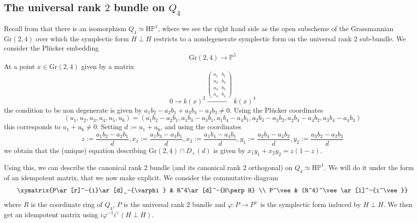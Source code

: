 \documentclass[11pt,leqno]{article}
\newcommand{\Proj}{{\mathbb P}}
\renewcommand{\1}{{\rm 1\hspace*{-0.4ex}%
\rule{0.1ex}{1.52ex}\hspace*{0.2ex}}}
\newcommand{\<}[1]{{\langle}#1 {\rangle}}
\theoremstyle{plain}
\theoremstyle{definition}
\theoremstyle{remark}
\numberwithin{equation}{section}
\begin{document}
\subsection{The universal rank $2$ bundle on $Q_4$}\label{sec:universal2bundle}

Recall from \cite{Panin21} that there is an isomorphism $Q_4\simeq \mathrm{H}\Proj^1$, where we see the right hand side as the open subscheme of the Grassmannian $\mathrm{Gr}(2,4)$ over which the symplectic form $H\perp H$ restricts to a nondegenerate symplectic form on the universal rank $2$ sub-bundle. We consider the Plücker embedding 
\[
\mathrm{Gr}(2,4)\to \mathbb{P}^5
\]
At a point $x\in  \mathrm{Gr}(2,4)$ given by a matrix
\[
0\to k(x)^2\xrightarrow{\begin{pmatrix} a_1 & b_1 \\ a_2 & b_2 \\ a_3 & b_3 \\ a_4 & b_4\end{pmatrix}} k(x)^4
\]
the condition to be non degenerate is given by $a_1b_2-a_2b_1+a_3b_4-a_4b_3\neq 0$. Using the Plücker coordinates 
\[
(u_1,u_2,u_3,u_4,u_5,u_6)=(a_1b_2-a_2b_1,a_1b_3-a_3b_1,a_1b_4-a_4b_1,a_2b_3-a_3b_2,a_2b_4-a_4b_2,a_3b_4-a_4b_3)
\]
this corresponds to $u_1+u_6\neq 0$. Setting $d:=u_1+u_6$, and using the coordinates 
\[
z:=\frac {a_1b_2-a_2b_1}d,x_1:=\frac {a_1b_3-a_3b_1}d, x_2:=\frac {a_1b_4-a_4b_1}d, y_1:=\frac {a_2b_4-a_4b_2}d, y_2:=\frac {a_3b_2-a_2b_3}d
\]
we obtain that the (unique) equation describing $\mathrm{Gr}(2,4)\cap D_+(d)$ is given by $x_1y_1+x_2y_2=z(1-z)$. 

Using this, we can describe the canonical rank $2$ bundle (and its canonical rank $2$ orthogonal) on $Q_4\simeq \mathrm{H}\Proj^1$. We will do it under the form of an idempotent matrix, that we now make explicit. We consider the commutative diagram
\[
\xymatrix{P\ar[r]^-{i}\ar[d]_-{\varphi} & R^4\ar[d]^-{H\perp H} \\
P^\vee & (R^4)^\vee\ar[l]^-{i^\vee}}
\]
where $R$ is the coordinate ring of $Q_4$, $P$ is the universal rank $2$ bundle and $\varphi\colon P\to P^\vee$ is the symplectic form induced by $H\perp H$. We then get an idempotent matrix using $i\varphi^{-1}i^\vee(H\perp H)$. 
\end{document}
